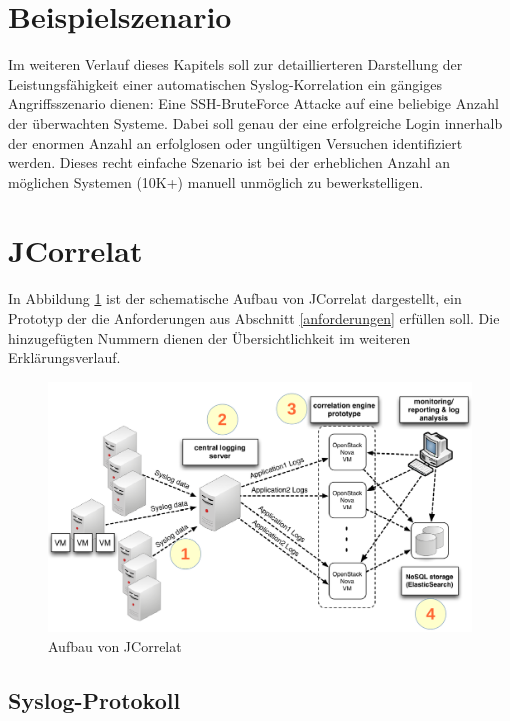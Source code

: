\section{Beispielszenario}\label{szenario}

Im weiteren Verlauf dieses Kapitels soll zur detaillierteren Darstellung der 
Leistungsfähigkeit einer automatischen Syslog-Korrelation ein gängiges 
Angriffsszenario dienen: Eine SSH-BruteForce Attacke auf eine beliebige Anzahl
der überwachten Systeme. Dabei soll genau der eine erfolgreiche Login innerhalb  der 
enormen Anzahl an erfolglosen oder ungültigen Versuchen identifiziert werden. Dieses 
recht einfache Szenario ist bei der erheblichen Anzahl an möglichen Systemen (10K+) 
manuell unmöglich zu bewerkstelligen.

\newpage
\section{JCorrelat}\label{sec_jcorrelat}

In Abbildung \ref{pic:jcorrelat} \cite{reissmann} ist der schematische Aufbau von 
JCorrelat dargestellt, ein Prototyp der die Anforderungen aus Abschnitt 
\ref{anforderungen} erfüllen soll. Die hinzugefügten Nummern dienen der Übersichtlichkeit 
im weiteren Erklärungsverlauf.   

\begin{figure}[htbp]
    \caption{Aufbau von JCorrelat}
    \label{pic:jcorrelat}\vspace{0.2cm}
    \centering
    \includegraphics[scale=0.36]{img/schema-correlat}
    
\end{figure}

\subsection{Syslog-Protokoll} \label{syslog-proto}

